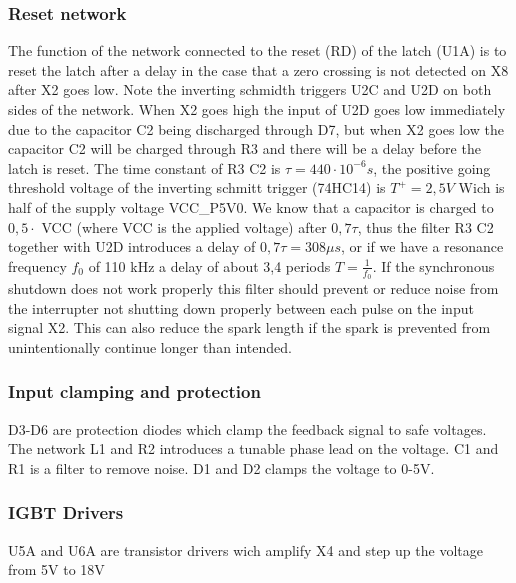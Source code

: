\subsubsection{Reset network}
\label{sec:reset_net}
The function of the network connected to the reset (RD) of the latch (U1A) is to reset the latch after a delay in the case that a zero crossing is not detected on X8 after X2 goes low. Note the inverting schmidth triggers U2C and U2D on both sides of the network. When X2 goes high the input of U2D goes low immediately due to the capacitor C2 being discharged through D7, but when X2 goes low the capacitor C2 will be charged through R3 and there will be a delay before the latch is reset. The time constant of R3 C2 is $\tau = 440 \cdot 10^{-6} s$, the positive going threshold voltage of the inverting schmitt trigger (74HC14) is $T^+ = 2,5V$ Wich is half of the supply voltage VCC\_P5V0. We know that a capacitor is charged to $0,5 \cdot$ VCC (where VCC is the applied voltage) after $0,7 \tau$, thus the filter R3 C2 together with U2D introduces a delay of $0,7 \tau = 308\mu s$, or if we have a resonance frequency $f_0$ of 110 kHz a delay of about 3,4 periods $T = \frac{1}{f_0}$. If the synchronous shutdown does not work properly this filter should prevent or reduce noise from the interrupter not shutting down properly between each pulse on the input signal X2. This can also reduce the spark length if the spark is prevented from unintentionally continue longer than intended.

\subsubsection{Input clamping and protection}
D3-D6 are protection diodes which clamp the feedback signal to safe voltages. The network L1 and R2 introduces a tunable phase lead on the voltage. C1 and R1 is a filter to remove noise. D1 and D2 clamps the voltage to 0-5V.

\subsubsection{IGBT Drivers}
U5A and U6A are transistor drivers wich amplify X4 and step up the voltage from 5V to 18V


